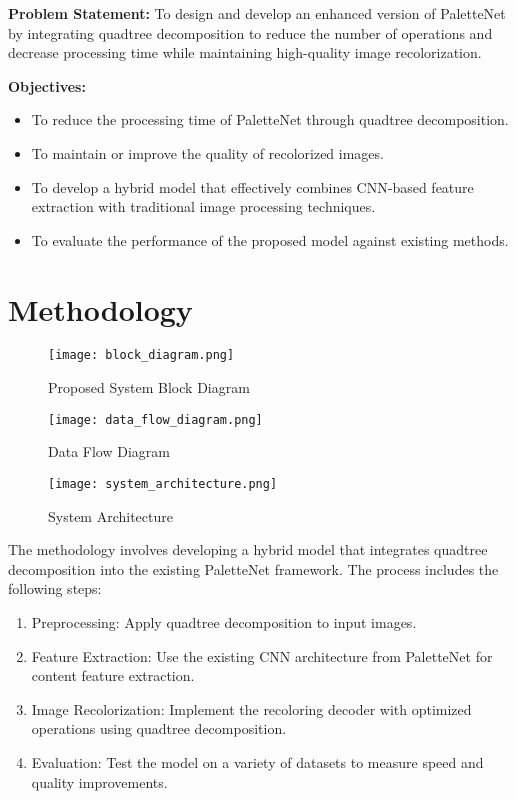 \documentclass[12pt,a4paper]{report}
\begin{document}
\textbf{Problem Statement:} To design and develop an enhanced version of PaletteNet by integrating quadtree decomposition to reduce the number of operations and decrease processing time while maintaining high-quality image recolorization.

\textbf{Objectives:}
\begin{itemize}
    \item To reduce the processing time of PaletteNet through quadtree decomposition.
    \item To maintain or improve the quality of recolorized images.
    \item To develop a hybrid model that effectively combines CNN-based feature extraction with traditional image processing techniques.
    \item To evaluate the performance of the proposed model against existing methods.
\end{itemize}

\section*{Methodology}
\begin{figure}[h!]
\centering
\texttt{[image: block\_diagram.png]}
\caption{Proposed System Block Diagram}
\label{fig:blockdiagram}
\end{figure}

\begin{figure}[h!]
\centering
\texttt{[image: data\_flow\_diagram.png]}
\caption{Data Flow Diagram}
\label{fig:dataflow}
\end{figure}

\begin{figure}[h!]
\centering
\texttt{[image: system\_architecture.png]}
\caption{System Architecture}
\label{fig:architecture}
\end{figure}

The methodology involves developing a hybrid model that integrates quadtree decomposition into the existing PaletteNet framework. The process includes the following steps:
\begin{enumerate}
    \item Preprocessing: Apply quadtree decomposition to input images.
    \item Feature Extraction: Use the existing CNN architecture from PaletteNet for content feature extraction.
    \item Image Recolorization: Implement the recoloring decoder with optimized operations using quadtree decomposition.
    \item Evaluation: Test the model on a variety of datasets to measure speed and quality improvements.
\end{enumerate}
\end{document}
